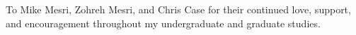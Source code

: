 To Mike Mesri, Zohreh Mesri, and Chris Case for their continued love, support, and encouragement throughout my undergraduate and graduate studies.